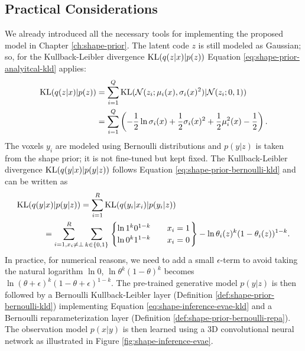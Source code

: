 \subsection{Practical Considerations}

We already introduced all the necessary
tools for implementing the proposed model in Chapter \ref{ch:shape-prior}.
The latent code $z$ is still modeled as Gaussian;
so, for the Kullback-Leibler divergence $\mathrm{KL}(q(z|x) | p(z))$ Equation
\eqref{eq:shape-prior-analyitcal-kld} applies:
\begin{align}
  \mathrm{KL}(q(z|x) | p(z)) &= \sum_{i = 1}^Q \mathrm{KL}(\mathcal{N}(z_i; \mu_i(x), \sigma_i(x)^2) | \mathcal{N}(z_i; 0, 1))\\
  &= \sum_{i = 1}^Q \left(- \frac{1}{2} \ln \sigma_i(x) + \frac{1}{2} \sigma_i(x)^2 + \frac{1}{2} \mu_i^2(x) - \frac{1}{2}\right).
\end{align}
The voxels $y_i$ are modeled using Bernoulli distributions and $p(y|z)$
is taken from the shape prior; it is not fine-tuned but
kept fixed. The Kullback-Leibler divergence $\mathrm{KL}(q(y|x)|p(y|z))$ 
follows Equation \eqref{eq:shape-prior-bernoulli-kld} and can be written as
\begin{align}
  \mathrm{KL}(q(y&|x)|p(y|z)) = \sum_{i = 1}^R \mathrm{KL}(q(y_i|x_i)|p(y_i|z))\\
  &= \sum_{i = 1, x_i \neq \bot}^R \sum_{k \in \{0,1\}} \left.\begin{cases}
    \ln 1^k 0^{1 - k} & \quad x_i = 1\\
    \ln 0^k 1^{1 - k} & \quad x_i = 0
  \end{cases}\right\} - \ln \theta_i(z)^k (1 - \theta_i(z))^{1-k}.
  \label{eq:shape-inference-evae-kld}
\end{align}
In practice, for numerical reasons, we need to add a small $\epsilon$-term
to avoid taking the natural logarithm $\ln 0$, \ie $\ln \theta^k (1-\theta)^k$
becomes $\ln (\theta + \epsilon)^k (1 - \theta + \epsilon)^{1 - k}$.
The pre-trained generative model $p(y | z)$ is then followed by a Bernoulli
Kullback-Leibler layer (\cf Definition \ref{def:shape-prior-bernoulli-kld})
implementing Equation \eqref{eq:shape-inference-evae-kld}
and a Bernoulli reparameterization layer (\cf Definition \ref{def:shape-prior-bernoulli-repa}).
The observation model $p(x | y)$ is then learned using a 3D convolutional neural
network as illustrated in Figure \ref{fig:shape-inference-evae}.

